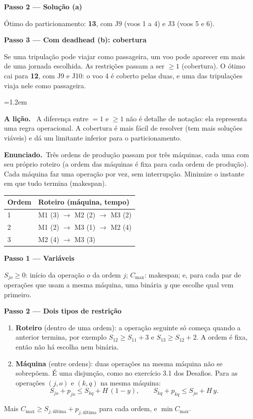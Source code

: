 \documentclass[11pt,a4paper]{article}
\newcommand{\enunciado}{\par\textbf{Enunciado.}\ }
\newcommand{\passo}[1]{\par\medskip\textbf{#1}\par}
\newenvironment{nota}[1]{\par\smallskip\begin{list}{}{\leftmargin=1.2em\rightmargin=0pt}\item[]\textbf{#1.}\ }{\end{list}}
\begin{document}
\passo{Passo 2 --- Solução (a)}
Ótimo do particionamento: \textbf{13}, com J9 (voos 1 a 4) e J3 (voos 5 e 6).

\passo{Passo 3 --- Com deadhead (b): cobertura}
Se uma tripulação pode viajar como passageira, um voo pode aparecer em mais de uma jornada escolhida. As restrições
passam a ser $\ge1$ (cobertura). O ótimo cai para \textbf{12}, com J9 e J10: o voo 4 é coberto pelas duas, e uma das
tripulações viaja nele como passageira.

\begin{nota}{A lição}
A diferença entre $=1$ e $\ge1$ não é detalhe de notação: ela representa uma regra operacional. A cobertura é mais
fácil de resolver (tem mais soluções viáveis) e dá um limitante inferior para o particionamento.
\end{nota}

\enunciado Três ordens de produção passam por três máquinas, cada uma com seu próprio roteiro (a ordem das máquinas é
fixa para cada ordem de produção). Cada máquina faz uma operação por vez, sem interrupção. Minimize o instante em que tudo
termina (makespan).
\begin{center}
\begin{tabular}{ll}
\toprule
Ordem & Roteiro (máquina, tempo)\\
\midrule
1 & M1 (3) $\to$ M2 (2) $\to$ M3 (2)\\
2 & M1 (2) $\to$ M3 (1) $\to$ M2 (4)\\
3 & M2 (4) $\to$ M3 (3)\\
\bottomrule
\end{tabular}
\end{center}

\passo{Passo 1 --- Variáveis}
$S_{jo}\ge0$: início da operação $o$ da ordem $j$; $C_{\max}$: makespan; e, para cada par de operações que usam a mesma
máquina, uma binária $y$ que escolhe qual vem primeiro.

\passo{Passo 2 --- Dois tipos de restrição}
\begin{enumerate}[label=(\roman*)]
  \item \textbf{Roteiro} (dentro de uma ordem): a operação seguinte só começa quando a anterior termina, por exemplo
        $S_{12}\ge S_{11}+3$ e $S_{13}\ge S_{12}+2$. A ordem é fixa, então não há escolha nem binária.
  \item \textbf{Máquina} (entre ordens): duas operações na mesma máquina não se sobrepõem. É uma disjunção, como no
        exercício 3.1 dos Desafios. Para as operações $(j,o)$ e $(k,q)$ na mesma máquina:
        \[
          S_{jo} + p_{jo} \le S_{kq} + H\,(1-y), \qquad S_{kq} + p_{kq} \le S_{jo} + H\,y .
        \]
\end{enumerate}
Mais $C_{\max}\ge S_{j,\text{última}}+p_{j,\text{última}}$ para cada ordem, e $\min C_{\max}$.
\end{document}
